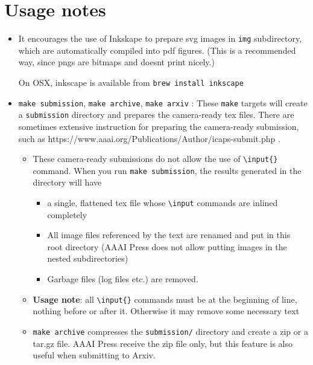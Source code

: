 \section{Usage notes}

\begin{itemize}
\item
  It encourages the use of Inkskape to
  prepare svg images in \texttt{img} subdirectory, which are
  automatically compiled into pdf figures. (This is a recommended way,
  since pngs are bitmaps and doesnt print nicely.)

  On OSX, inkscape is available from \texttt{brew\ install\ inkscape}
\item
  \texttt{make\ submission}, \texttt{make\ archive},
  \texttt{make\ arxiv} : These \texttt{make} targets will create a
  \texttt{submission} directory and prepares the camera-ready tex files.
  There are sometimes extensive instruction for preparing the
  camera-ready submission, such as
  https://www.aaai.org/Publications/Author/icaps-submit.php .

  \begin{itemize}
  
  \item
    These camera-ready submissions do not allow the use of
    \texttt{\textbackslash{}input\{\}} command. When you run
    \texttt{make\ submission}, the results generated in the directory
    will have

    \begin{itemize}
    
    \item
      a single, flattened tex file whose \texttt{\textbackslash{}input}
      commands are inlined completely
    \item
      All image files referenced by the text are renamed and put in this
      root directory (AAAI Press does not allow putting images in the
      nested subdirectories)
    \item
      Garbage files (log files etc.) are removed.
    \end{itemize}
  \item
    \textbf{Usage note}: all \texttt{\textbackslash{}input\{\}} commands
    must be at the beginning of line, nothing before or after it.
    Otherwise it may remove some necessary text
  \item
    \texttt{make\ archive} compresses the \texttt{submission/} directory
    and create a zip or a tar.gz file. AAAI Press receive the zip file
    only, but this feature is also useful when submitting to Arxiv.


\end{itemize}
\end{itemize}
